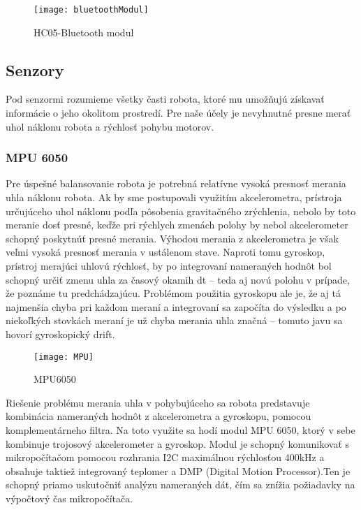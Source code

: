\begin{figure}[h]
\centering
\texttt{[image: bluetoothModul]}
\caption{HC05-Bluetooth modul}
\label{fig:bluetoothModul}
\end{figure}

\subsection{Senzory}
Pod senzormi rozumieme všetky časti robota, ktoré mu umožňujú získavať informácie o jeho okolitom prostredí. Pre naše účely je nevyhnutné presne merať uhol náklonu robota a rýchlosť pohybu motorov.

\subsubsection{MPU 6050}
Pre úspešné balansovanie robota je potrebná relatívne vysoká presnosť merania uhla náklonu robota. Ak by sme postupovali využitím akcelerometra, prístroja určujúceho uhol náklonu podľa pôsobenia gravitačného zrýchlenia, nebolo by toto meranie dosť presné, keďže pri rýchlych zmenách polohy by nebol akcelerometer schopný poskytnúť presné merania. Výhodou merania z akcelerometra je však veľmi vysoká presnosť merania v ustálenom stave. Naproti tomu gyroskop, prístroj merajúci uhlovú rýchlosť, by po integrovaní nameraných hodnôt bol schopný určiť zmenu uhla za časový okamih dt – teda aj novú polohu v prípade, že poznáme tu predchádzajúcu. Problémom použitia gyroskopu ale je, že aj tá najmenšia chyba pri každom meraní a integrovaní sa započíta do výsledku a po niekoľkých stovkách meraní je už chyba merania uhla značná – tomuto javu sa hovorí gyroskopický drift. 
\begin{figure}[h]
\centering
\texttt{[image: MPU]}
\caption{MPU6050}
\label{fig:MPU}
\end{figure}
Riešenie problému merania uhla v pohybujúceho sa robota predstavuje kombinácia nameraných hodnôt z akcelerometra a gyroskopu, pomocou komplementárneho filtra. Na toto využite sa hodí modul MPU 6050, ktorý v sebe kombinuje trojosový akcelerometer a gyroskop. Modul je schopný komunikovať s mikropočítačom pomocou rozhrania I2C maximálnou rýchlosťou 400kHz a obsahuje taktiež integrovaný teplomer a DMP (Digital Motion Processor).Ten je schopný priamo uskutočniť analýzu nameraných dát, čím sa znížia požiadavky na výpočtový čas mikropočítača.




